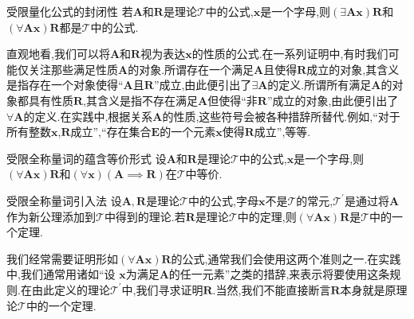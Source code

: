\begin{metatheorem}{受限量化公式的封闭性}{}
	若$\boldsymbol{A}$和$\boldsymbol{R}$是理论$\mathcal{T}$中的公式,$\boldsymbol{x}$是一个字母,则$\left(\exists\boldsymbol{A}\boldsymbol{x}\right)\boldsymbol{R}$和$\left(\forall\boldsymbol{A}\boldsymbol{x}\right)\boldsymbol{R}$都是$\mathcal{T}$中的公式.
\end{metatheorem}

\begin{remark}{}{}
	直观地看,我们可以将$\boldsymbol{A}$和$\boldsymbol{R}$视为表达$\boldsymbol{x}$的性质的公式.在一系列证明中,有时我们可能仅关注那些满足性质$\boldsymbol{A}$的对象.所谓存在一个满足$\boldsymbol{A}$且使得$\boldsymbol{R}$成立的对象,其含义是指存在一个对象使得``$\boldsymbol{A}$且$\boldsymbol{R}$''成立,由此便引出了$\exists\boldsymbol{A}$的定义.所谓所有满足$\boldsymbol{A}$的对象都具有性质$\boldsymbol{R}$,其含义是指不存在满足$\boldsymbol{A}$但使得``非$\boldsymbol{R}$''成立的对象,由此便引出了$\forall\boldsymbol{A}$的定义.在实践中,根据关系$\boldsymbol{A}$的性质,这些符号会被各种措辞所替代.例如,``对于所有整数$\boldsymbol{x}$,$\boldsymbol{R}$成立'',``存在集合$\boldsymbol{E}$的一个元素$\boldsymbol{x}$使得$\boldsymbol{R}$成立'',等等.
\end{remark}

\begin{metatheorem}{受限全称量词的蕴含等价形式}{}
	设$\boldsymbol{A}$和$\boldsymbol{R}$是理论$\mathcal{T}$中的公式,$\boldsymbol{x}$是一个字母,则$\left(\forall\boldsymbol{A}\boldsymbol{x}\right)\boldsymbol{R}$和$\left(\forall\boldsymbol{x}\right)\left(\boldsymbol{A}\implies\boldsymbol{R}\right)$在$\mathcal{T}$中等价.
\end{metatheorem}

\begin{metatheorem}{受限全称量词引入法}{}
	设$\boldsymbol{A},\boldsymbol{R}$是理论$\mathcal{T}$中的公式,字母$\boldsymbol{x}$不是$\mathcal{T}$的常元,$\mathcal{T}^{\prime}$是通过将$\boldsymbol{A}$作为新公理添加到$\mathcal{T}$中得到的理论.若$\boldsymbol{R}$是理论$\mathcal{T}$中的定理,则$\left(\forall\boldsymbol{A}\boldsymbol{x}\right)\boldsymbol{R}$是$\mathcal{T}$中的一个定理.
\end{metatheorem}

\begin{remark}{}{}
	我们经常需要证明形如$\left(\forall\boldsymbol{A}\boldsymbol{x}\right)\boldsymbol{R}$的公式,通常我们会使用这两个准则之一.在实践中,我们通常用诸如``设 $\boldsymbol{x}$为满足$\boldsymbol{A}$的任一元素''之类的措辞,来表示将要使用这条规则.在由此定义的理论$\mathcal{T}^{\prime}$中,我们寻求证明$\boldsymbol{R}$.当然,我们不能直接断言$\boldsymbol{R}$本身就是原理论$\mathcal{T}$中的一个定理.
\end{remark}

